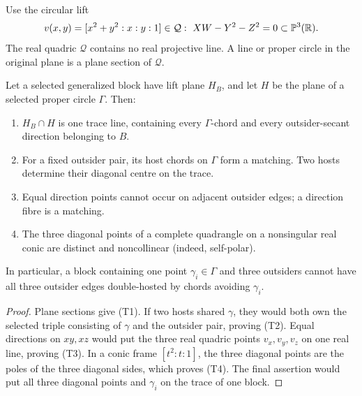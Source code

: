 Use the circular lift
\[
 v(x,y)=[x^2+y^2:x:y:1]\in
 \mathcal Q:\ XW-Y^2-Z^2=0\subset\mathbb{P}^3(\mathbb{R}).
\]
The real quadric $\mathcal Q$ contains no real projective line.  A line or
proper circle in the original plane is a plane section of $\mathcal Q$.

\begin{lemma}\label{lem:circle-lift-trace}
Let a selected generalized block have lift plane $H_B$, and let $H$ be the
plane of a selected proper circle $\Gamma$.  Then:
\begin{enumerate}[label=\textup{(T\arabic*)}]
\item $H_B\cap H$ is one trace line, containing every $\Gamma$-chord and
every outsider-secant direction belonging to $B$.
\item For a fixed outsider pair, its host chords on $\Gamma$ form a
matching.  Two hosts determine their diagonal centre on the trace.
\item Equal direction points cannot occur on adjacent outsider edges; a
direction fibre is a matching.
\item The three diagonal points of a complete quadrangle on a nonsingular
real conic are distinct and noncollinear (indeed, self-polar).
\end{enumerate}
In particular, a block containing one point $\gamma_i\in\Gamma$ and three
outsiders cannot have all three outsider edges double-hosted by chords
avoiding $\gamma_i$.
\end{lemma}

\begin{proof}
Plane sections give (T1).  If two hosts shared $\gamma$, they would both
own the selected triple consisting of $\gamma$ and the outsider pair,
proving (T2).  Equal directions on $xy,xz$ would put the three real quadric
points $v_x,v_y,v_z$ on one real line, proving (T3).  In a conic frame
$[t^2:t:1]$, the three diagonal points are the poles of the three diagonal
sides, which proves (T4).  The final assertion would put all three diagonal
points and $\gamma_i$ on the trace of one block.
\end{proof}

